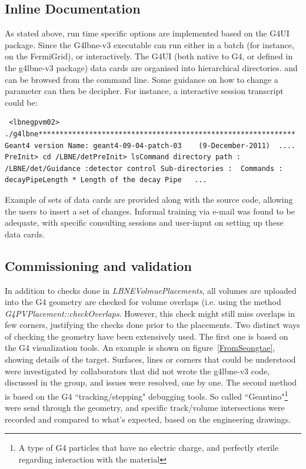 \subsection{Inline Documentation}     As stated above, run time specific options are implemented based on the G4UI package. Since the G4lbne-v3 executable can run either in a batch (for instance,    on the FermiGrid), or interactively. The G4UI (both native to G4, or defined in the g4lbne-v3 package) data cards are organised into hierarchical directories.     and can be browsed from the command line. Some guidance on how to change a parameter can then be decipher.  For instance, a interactive session transcript    could be:    \begin{verbatim} <lbnegpvm02> ./g4lbne************************************************************* Geant4 version Name: geant4-09-04-patch-03    (9-December-2011)  ....  PreInit> cd /LBNE/detPreInit> lsCommand directory path : /LBNE/det/Guidance :detector control Sub-directories :  Commands :    decayPipeLength * Length of the decay Pipe   ...    \end{verbatim}   Example of sets of data cards are provided along with the source code, allowing the users to insert a  set of changes. Informal training via e-mail was found to  be adequate, with specific consulting sessions and user-input on setting up these data cards.        

\subsection{Commissioning and validation}      In addition to checks done in {\em LBNEVolmuePlacements}, all volumes are uploaded into the G4 geometry are checked for volume overlaps (i.e. using the method {\em   G4PVPlacement::checkOverlaps}.  However, this check might still miss overlaps in few corners, justifying the checks done prior to the placements.      Two distinct ways of checking the geometry have been extensively used.  The first one is based on the G4 visualization tools. An example is shown on   figure~\ref{FromSeongtae}, showing details of the target.  Surfaces, lines or corners that could be understood were investigated by collaborators that did not   wrote the g4lbne-v3 code, discussed in the group, and issues were resolved, one by one. The second method is based on the G4 ``tracking/stepping" debugging   tools. So called ``Geantino"\footnote{A type of G4 particles that have no electric charge, and perfectly sterile regarding interaction with the material} were   send through the geometry, and specific track/volume intersections were recorded and compared to what's expected, based on the engineering drawings.  

